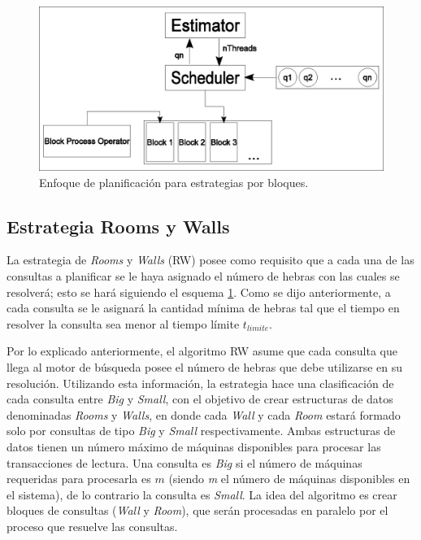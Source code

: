 \begin{figure}[tp]
\centering
\includegraphics[scale=.75]{images/scheduler_bloques.eps}
\caption{Enfoque de planificación para estrategias por bloques.}
\label{fig:schedulerbloques}
\end{figure}  


\subsection{Estrategia Rooms y Walls}
\label{scheduling:fr}
La estrategia de \textit{Rooms} y \textit{Walls} (RW) posee como requisito que a cada una de las consultas a planificar se le haya asignado el número de hebras con las cuales se resolverá; esto se hará siguiendo el esquema \ref{fig:schedulerbloques}. Como se dijo anteriormente, a cada consulta se le asignará la cantidad mínima de hebras tal que el tiempo en resolver la consulta sea menor al tiempo límite $t_{limite}$.

Por lo explicado anteriormente, el algoritmo RW asume que cada consulta que llega al motor de búsqueda posee el número de hebras que debe utilizarse en su resolución. Utilizando esta información, la estrategia hace una clasificación de cada consulta entre \textit{Big} y \textit{Small}, con el objetivo de crear estructuras de datos denominadas \textit{Rooms} y \textit{Walls}, en donde cada \textit{Wall} y cada \textit{Room} estará formado solo por consultas de tipo \textit{Big} y \textit{Small} respectivamente. Ambas estructuras de datos tienen un número máximo de máquinas disponibles para procesar las transacciones de lectura. Una consulta es \textit{Big} si el número de máquinas requeridas para procesarla es $m$ (siendo \textit{m} el número de máquinas disponibles en el sistema), de lo contrario la consulta es \textit{Small}. La idea del algoritmo es crear bloques de consultas (\textit{Wall} y \textit{Room}), que serán procesadas en paralelo por el proceso que resuelve las consultas. 

